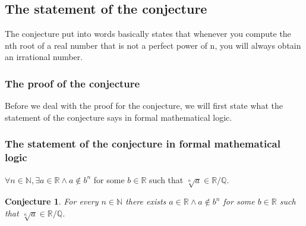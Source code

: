 \documentclass{article}
\newtheorem*{conjecture*}{Conjecture}
\begin{document}
\subsection{The statement of the conjecture}   
The conjecture put into words basically states that whenever you compute the nth root of a real number that is not a perfect power of n, you will always obtain an irrational number. 

\subsubsection{The proof of the conjecture} 
Before we deal with the proof for the conjecture, we will first state what the statement of the conjecture says in formal mathematical logic. 

\subsubsection{The statement of the conjecture in formal mathematical logic} 
\(\forall n \in \mathds{N},\exists a \in \mathds{R} \wedge a \notin  b^n\) for some \(b \in \mathds{R}\) such that \(\sqrt[n]{a} \in \mathds{R}/\mathds{Q}\).  

\begin{conjecture*}
  For every \(n \in \mathds{N}\) there exists \(a \in \mathds{R} \wedge a \notin  b^n\) for some \(b \in \mathds{R}\) such that \(\sqrt[n]{a} \in \mathds{R}/\mathds{Q}\). 
\end{conjecture*} 
\end{document}
